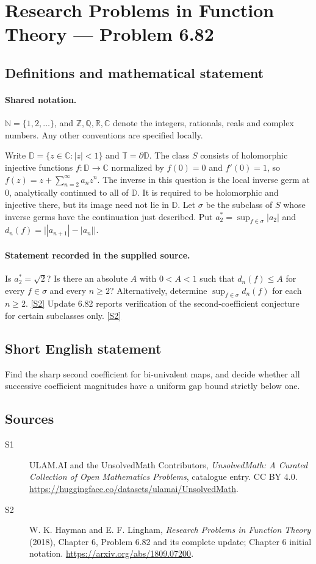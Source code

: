 \documentclass[11pt]{article}
\newcommand{\sref}[2]{\hyperlink{source:#1:#2}{[S#2]}}
\begin{document}
\section{Research Problems in Function Theory — Problem 6.82}\label{statement}

\subsection{Definitions and mathematical statement}

\paragraph{Shared notation.}$\mathbb N=\{1,2,\ldots\}$, and $\mathbb Z,\mathbb Q,\mathbb R,\mathbb C$ denote the integers, rationals, reals and complex numbers. Any other conventions are specified locally.


Write $\mathbb D=\{z\in\mathbb C:|z|<1\}$ and $\mathbb T=\partial\mathbb D$. The class $S$ consists of holomorphic injective functions $f:\mathbb D\to\mathbb C$ normalized by $f(0)=0$ and $f'(0)=1$, so $f(z)=z+\sum_{n=2}^{\infty}a_nz^n$. The inverse in this question is the local inverse germ at $0$, analytically continued to all of $\mathbb D$. It is required to be holomorphic and injective there, but its image need not lie in $\mathbb D$. Let $\sigma$ be the subclass of $S$ whose inverse germs have the continuation just described. Put $a_2^*=\sup_{f\in\sigma}|a_2|$ and $d_n(f)=\bigl||a_{n+1}|-|a_n|\bigr|$.
\paragraph{Statement recorded in the supplied source.}
Is $a_2^*=\sqrt2$? Is there an absolute $A$ with $0<A<1$ such that $d_n(f)\le A$ for every $f\in\sigma$ and every $n\ge2$? Alternatively, determine $\sup_{f\in\sigma}d_n(f)$ for each $n\ge2$. \sref{statement}{2}
Update 6.82 reports verification of the second-coefficient conjecture for certain subclasses only. \sref{statement}{2}
\subsection{Short English statement}
Find the sharp second coefficient for bi-univalent maps, and decide whether all successive coefficient magnitudes have a uniform gap bound strictly below one.
\subsection{Sources}
\begin{description}
\item[\hypertarget{source:statement:1}{S1}] ULAM.AI and the UnsolvedMath Contributors, \emph{UnsolvedMath: A Curated Collection of Open Mathematics Problems}, catalogue entry. CC BY 4.0. \url{https://huggingface.co/datasets/ulamai/UnsolvedMath}.
\item[\hypertarget{source:statement:2}{S2}] W. K. Hayman and E. F. Lingham, \emph{Research Problems in Function Theory} (2018), Chapter 6, Problem 6.82 and its complete update; Chapter 6 initial notation. \url{https://arxiv.org/abs/1809.07200}.
\end{description}
\label{end:statement}
\end{document}
